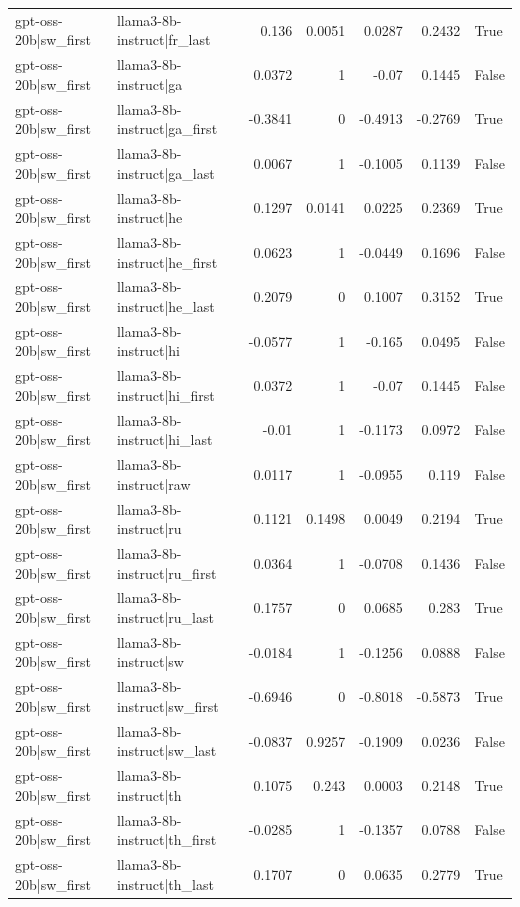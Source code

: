 \begin{table}
\begin{tabular}{l l r r r r l}
gpt-oss-20b|sw_first & llama3-8b-instruct|fr_last & 0.136 & 0.0051 & 0.0287 & 0.2432 & True \\
gpt-oss-20b|sw_first & llama3-8b-instruct|ga & 0.0372 & 1 & -0.07 & 0.1445 & False \\
gpt-oss-20b|sw_first & llama3-8b-instruct|ga_first & -0.3841 & 0 & -0.4913 & -0.2769 & True \\
gpt-oss-20b|sw_first & llama3-8b-instruct|ga_last & 0.0067 & 1 & -0.1005 & 0.1139 & False \\
gpt-oss-20b|sw_first & llama3-8b-instruct|he & 0.1297 & 0.0141 & 0.0225 & 0.2369 & True \\
gpt-oss-20b|sw_first & llama3-8b-instruct|he_first & 0.0623 & 1 & -0.0449 & 0.1696 & False \\
gpt-oss-20b|sw_first & llama3-8b-instruct|he_last & 0.2079 & 0 & 0.1007 & 0.3152 & True \\
gpt-oss-20b|sw_first & llama3-8b-instruct|hi & -0.0577 & 1 & -0.165 & 0.0495 & False \\
gpt-oss-20b|sw_first & llama3-8b-instruct|hi_first & 0.0372 & 1 & -0.07 & 0.1445 & False \\
gpt-oss-20b|sw_first & llama3-8b-instruct|hi_last & -0.01 & 1 & -0.1173 & 0.0972 & False \\
gpt-oss-20b|sw_first & llama3-8b-instruct|raw & 0.0117 & 1 & -0.0955 & 0.119 & False \\
gpt-oss-20b|sw_first & llama3-8b-instruct|ru & 0.1121 & 0.1498 & 0.0049 & 0.2194 & True \\
gpt-oss-20b|sw_first & llama3-8b-instruct|ru_first & 0.0364 & 1 & -0.0708 & 0.1436 & False \\
gpt-oss-20b|sw_first & llama3-8b-instruct|ru_last & 0.1757 & 0 & 0.0685 & 0.283 & True \\
gpt-oss-20b|sw_first & llama3-8b-instruct|sw & -0.0184 & 1 & -0.1256 & 0.0888 & False \\
gpt-oss-20b|sw_first & llama3-8b-instruct|sw_first & -0.6946 & 0 & -0.8018 & -0.5873 & True \\
gpt-oss-20b|sw_first & llama3-8b-instruct|sw_last & -0.0837 & 0.9257 & -0.1909 & 0.0236 & False \\
gpt-oss-20b|sw_first & llama3-8b-instruct|th & 0.1075 & 0.243 & 0.0003 & 0.2148 & True \\
gpt-oss-20b|sw_first & llama3-8b-instruct|th_first & -0.0285 & 1 & -0.1357 & 0.0788 & False \\
gpt-oss-20b|sw_first & llama3-8b-instruct|th_last & 0.1707 & 0 & 0.0635 & 0.2779 & True \\

\end{tabular}
\end{table}
